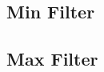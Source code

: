 \documentclass[a4paper,16pt]{article}
\begin{document}
	\subsection{Min Filter}
	\vspace{0.2in}
	\newpage
	\subsection{Max Filter}
	\vspace{0.2in}
\end{document}
